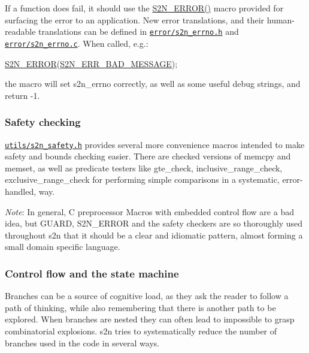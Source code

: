 If a function does fail, it should use the \hyperlink{s2n__errno_8h_a4728100d8e1cd9097e9318a7e9fed9a9}{S2\+N\+\_\+\+E\+R\+R\+O\+R()} macro provided for surfacing the error to an application. New error translations, and their human-\/readable translations can be defined in \href{https://github.com/awslabs/s2n/blob/master/error/s2n_errno.h}{\tt error/s2n\+\_\+errno.\+h} and \href{https://github.com/awslabs/s2n/blob/master/error/s2n_errno.c}{\tt error/s2n\+\_\+errno.\+c}. When called, e.\+g.\+:


\begin{DoxyCode}
\hyperlink{s2n__errno_8h_a4728100d8e1cd9097e9318a7e9fed9a9}{S2N\_ERROR}(\hyperlink{s2n__errno_8h_a64ed9ec59a957387654c5e5865325374ad61ca0bcc8f9f8bf3e065de30ad547fb}{S2N\_ERR\_BAD\_MESSAGE});
\end{DoxyCode}


the macro will set s2n\+\_\+errno correctly, as well as some useful debug strings, and return -\/1.

\subsubsection*{Safety checking}

\href{https://github.com/awslabs/s2n/blob/master/utils/s2n_safety.h}{\tt utils/s2n\+\_\+safety.\+h} provides several more convenience macros intended to make safety and bounds checking easier. There are checked versions of memcpy and memset, as well as predicate testers like gte\+\_\+check, inclusive\+\_\+range\+\_\+check, exclusive\+\_\+range\+\_\+check for performing simple comparisons in a systematic, error-\/handled, way.

{\itshape Note}\+: In general, C preprocessor Macros with embedded control flow are a bad idea, but G\+U\+A\+RD, S2\+N\+\_\+\+E\+R\+R\+OR and the safety checkers are so thoroughly used throughout s2n that it should be a clear and idiomatic pattern, almost forming a small domain specific language.

\subsubsection*{Control flow and the state machine}

Branches can be a source of cognitive load, as they ask the reader to follow a path of thinking, while also remembering that there is another path to be explored. When branches are nested they can often lead to impossible to grasp combinatorial explosions. s2n tries to systematically reduce the number of branches used in the code in several ways.

